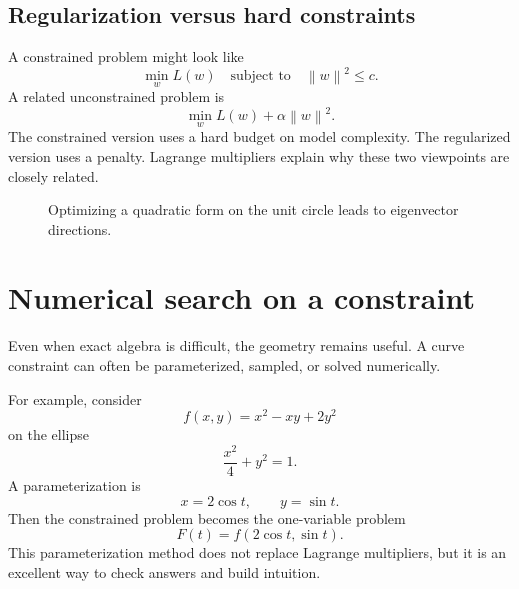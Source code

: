 \documentclass[11pt]{article}
\newcommand{\norm}[1]{\left\lVert #1\right\rVert}
\begin{document}
\subsection*{Regularization versus hard constraints}
A constrained problem might look like
\[
\min_w L(w)\quad \text{subject to}\quad \norm{w}^2\le c.
\]
A related unconstrained problem is
\[
\min_w L(w)+\alpha \norm{w}^2.
\]
The constrained version uses a hard budget on model complexity. The regularized version uses a penalty. Lagrange multipliers explain why these two viewpoints are closely related.

\begin{figure}[H]
\centering
{}
\caption{Optimizing a quadratic form on the unit circle leads to eigenvector directions.}
\end{figure}

\section{Numerical search on a constraint}

Even when exact algebra is difficult, the geometry remains useful. A curve constraint can often be parameterized, sampled, or solved numerically.

For example, consider
\[
f(x,y)=x^2-xy+2y^2
\]
on the ellipse
\[
\frac{x^2}{4}+y^2=1.
\]
A parameterization is
\[
x=2\cos t,
\qquad y=\sin t.
\]
Then the constrained problem becomes the one-variable problem
\[
F(t)=f(2\cos t,\sin t).
\]
This parameterization method does not replace Lagrange multipliers, but it is an excellent way to check answers and build intuition.
\end{document}
